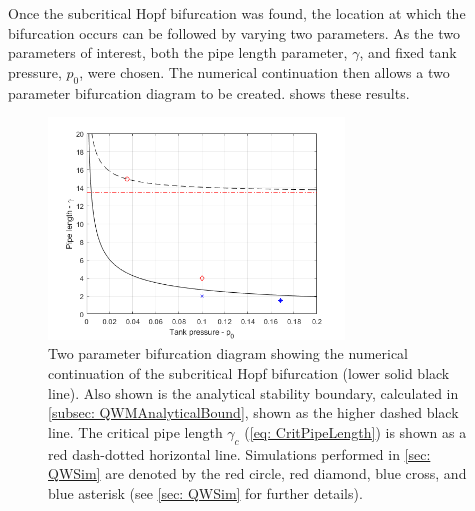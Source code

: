 Once the subcritical Hopf bifurcation was found, the location at which the bifurcation occurs can be followed by varying two parameters. As the two parameters of interest, both the pipe length parameter, $\gamma$, and fixed tank pressure, $p_0$, were chosen. The numerical continuation then allows a two parameter bifurcation diagram
to be created.  shows these results.
% 
~
\begin{figure}[ht]
    \centering
    \includegraphics[width=0.7\textwidth]{Figures/BifurcationDiagram.png}
    \caption{Two parameter bifurcation diagram showing the numerical continuation of the subcritical Hopf bifurcation (lower solid black line). Also shown is the analytical stability boundary, calculated in \cref{subsec: QWMAnalyticalBound}, shown as the higher dashed black line. The critical pipe length $\gamma_c$ (\cref{eq: CritPipeLength}) is shown as a red dash-dotted horizontal line. Simulations performed in \cref{sec: QWSim} are denoted by the red circle, red diamond, blue cross, and blue asterisk (see \cref{sec: QWSim} for further details).}
    \label{fig: BifurcationDiagram}
\end{figure}
% 

